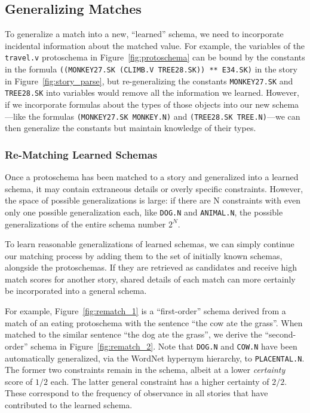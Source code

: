 \subsection{Generalizing Matches}
To generalize a match into a new, ``learned'' schema, we need to incorporate incidental information about the matched value. For example, the variables of the \texttt{travel.v} protoschema in Figure~\ref{fig:protoschema} can be bound by the constants in the formula \texttt{((MONKEY27.SK (CLIMB.V TREE28.SK)) ** E34.SK)} in the story in Figure~\ref{fig:story_parse}, but re-generalizing the constants \texttt{MONKEY27.SK} and \texttt{TREE28.SK} into variables would remove all the information we learned. However, if we incorporate formulas about the types of those objects into our new schema---like the formulas \texttt{(MONKEY27.SK MONKEY.N)} and \texttt{(TREE28.SK TREE.N)}---we can then generalize the constants but maintain knowledge of their types.

\subsubsection{Re-Matching Learned Schemas}

Once a protoschema has been matched to a story and generalized into a learned schema, it may contain extraneous details or overly specific constraints. However, the space of possible generalizations is large: if there are N constraints with even only one possible generalization each, like \texttt{DOG.N} and \texttt{ANIMAL.N}, the possible generalizations of the entire schema number $2^N$.

To learn reasonable generalizations of learned schemas, we can simply continue our matching process by adding them to the set of initially known schemas, alongside the protoschemas. If they are retrieved as candidates and receive high match scores for another story, shared details of each match can more certainly be incorporated into a general schema.

For example, Figure~\ref{fig:rematch_1} is a ``first-order'' schema derived from a match of an eating protoschema with the sentence ``the cow ate the grass''. When matched to the similar sentence ``the dog ate the grass'', we derive the ``second-order'' schema in Figure~\ref{fig:rematch_2}. Note that \texttt{DOG.N} and \texttt{COW.N} have been automatically generalized, via the WordNet hypernym hierarchy, to \texttt{PLACENTAL.N}. The former two constraints remain in the schema, albeit at a lower \textit{certainty} score of $1/2$ each. The latter general constraint has a higher certainty of $2/2$. These correspond to the frequency of observance in all stories that have contributed to the learned schema.

